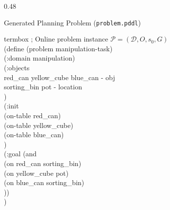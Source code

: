 \documentclass[10pt]{beamer}
\begin{document}
\begin{frame}[t]
\begin{columns}[T]
    \begin{column}{0.48\textwidth}
        \begin{block}{Generated Planning Problem (\texttt{problem.pddl})}
            \begin{beamercolorbox}[sep=3pt,rounded=true,shadow=true,wd=\linewidth]{termbox}
                \ttfamily\tiny
                ; Online problem instance $\mathcal{P} = (\mathcal{D}, O, s_0, G)$\\
                (define (problem manipulation-task)\\
                \hspace{2mm} (:domain manipulation)\\
                \hspace{2mm} (:objects\\
                \hspace{4mm} red\_can yellow\_cube blue\_can - obj\\
                \hspace{4mm} sorting\_bin pot - location\\
                \hspace{2mm} )\\
                \hspace{2mm} (:init\\
                \hspace{4mm} (on-table red\_can)\\
                \hspace{4mm} (on-table yellow\_cube)\\
                \hspace{4mm} (on-table blue\_can)\\
                \hspace{2mm} )\\
                \hspace{2mm} (:goal (and\\
                \hspace{4mm} (on red\_can sorting\_bin)\\
                \hspace{4mm} (on yellow\_cube pot)\\
                \hspace{4mm} (on blue\_can sorting\_bin)\\
                \hspace{2mm} ))\\
                )
            \end{beamercolorbox}
        \end{block}
    \end{column}
\end{columns}
\end{frame}
\end{document}
